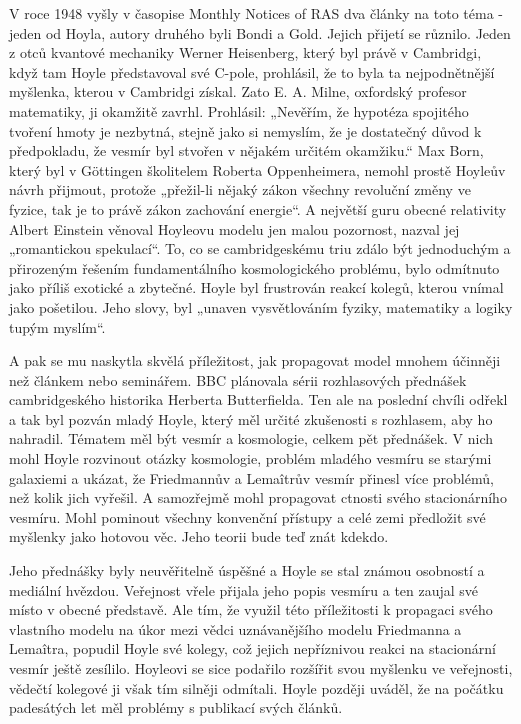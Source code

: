   V roce 1948 vyšly v časopise Monthly Notices of RAS dva články na toto téma - jeden od Hoyla,
  autory druhého byli Bondi a Gold. Jejich přijetí se různilo. Jeden z otců kvantové mechaniky
  Werner Heisenberg, který byl právě v Cambridgi, když tam Hoyle představoval své C-pole, prohlásil,
  že to byla ta nejpodnětnější myšlenka, kterou v Cambridgi získal. Zato E. A. Milne, oxfordský
  profesor matematiky, ji okamžitě zavrhl. Prohlásil: „Nevěřím, že hypotéza spojitého tvoření hmoty
  je nezbytná, stejně jako si nemyslím, že je dostatečný důvod k předpokladu, že vesmír byl stvořen
  v nějakém určitém okamžiku.“ Max Born, který byl v Göttingen školitelem Roberta Oppenheimera,
  nemohl prostě Hoyleův návrh přijmout, protože „přežil-li nějaký zákon všechny revoluční změny ve
  fyzice, tak je to právě zákon zachování energie“. A největší guru obecné relativity Albert
  Einstein věnoval Hoyleovu modelu jen malou pozornost, nazval jej „romantickou spekulací“. To, co
  se cambridgeskému triu zdálo být jednoduchým a přirozeným řešením fundamentálního kosmologického
  problému, bylo odmítnuto jako příliš exotické a zbytečné. Hoyle byl frustrován reakcí kolegů,
  kterou vnímal jako pošetilou. Jeho slovy, byl „unaven vysvětlováním fyziky, matematiky a logiky
  tupým myslím“. 

  A pak se mu naskytla skvělá příležitost, jak propagovat model mnohem účinněji než článkem nebo
  seminářem. BBC plánovala sérii rozhlasových přednášek cambridgeského historika Herberta
  Butterfielda. Ten ale na poslední chvíli odřekl a tak byl pozván mladý Hoyle, který měl určité
  zkušenosti s rozhlasem, aby ho nahradil. Tématem měl být vesmír a kosmologie, celkem pět
  přednášek. V nich mohl Hoyle rozvinout otázky kosmologie, problém mladého vesmíru se starými
  galaxiemi a ukázat, že Friedmannův a Lemaîtrův vesmír přinesl více problémů, než kolik jich
  vyřešil. A samozřejmě mohl propagovat ctnosti svého stacionárního vesmíru. Mohl pominout všechny
  konvenční přístupy a celé zemi předložit své myšlenky jako hotovou věc. Jeho teorii bude teď znát
  kdekdo. 

  Jeho přednášky byly neuvěřitelně úspěšné a Hoyle se stal známou osobností a mediální hvězdou.
  Veřejnost vřele přijala jeho popis vesmíru a ten zaujal své místo v obecné představě. Ale tím, že
  využil této příležitosti k propagaci svého vlastního modelu na úkor mezi vědci uznávanějšího
  modelu Friedmanna a Lemaîtra, popudil Hoyle své kolegy, což jejich nepříznivou reakci na
  stacionární vesmír ještě zesílilo. Hoyleovi se sice podařilo rozšířit svou myšlenku ve veřejnosti,
  vědečtí kolegové ji však tím silněji odmítali. Hoyle později uváděl, že na počátku padesátých let
  měl problémy s publikací svých článků. 

